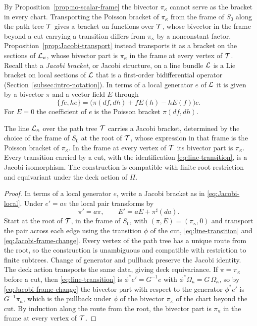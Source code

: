 By Proposition~\ref{prop:no-scalar-frame} the bivector $\pi_\kappa$ cannot
serve as the bracket in every chart.  Transporting the Poisson bracket of
$\pi_\kappa$ from the frame of $S_0$ along the path tree $\mathcal T$ gives a
bracket on functions over $\mathcal T$, whose bivector in the frame beyond a cut
carrying a transition differs from $\pi_\kappa$ by a nonconstant factor.
Proposition~\ref{prop:Jacobi-transport} instead transports it as a bracket on
the sections of $\mathcal L_\kappa$, whose bivector part is $\pi_\kappa$ in the
frame at every vertex of $\mathcal T$.  Recall that a \emph{Jacobi
bracket}, or Jacobi structure, on a line bundle $\mathcal L$ is a Lie bracket on
local sections of $\mathcal L$ that is a first-order bidifferential operator
\cite{kirillov1976,lichnerowicz1978,vitaglianowade2016}
(Section~\ref{subsec:intro-notation}).  In terms of a local generator $e$
of $\mathcal L$ it is given by a bivector $\pi$ and a vector field $E$ through
\begin{equation}\label{eq:Jacobi-local}
 \{fe,he\}=\bigl(\pi(df,dh)+fE(h)-hE(f)\bigr)e.
\end{equation}
For $E=0$ the coefficient of $e$ is the Poisson bracket $\pi(df,dh)$.

\begin{proposition}\label{prop:Jacobi-transport}
The line $\mathcal L_\kappa$ over the path tree $\mathcal T$ carries a Jacobi bracket,
determined by the choice of the frame of $S_0$ at the root of $\mathcal T$, whose
expression in that frame is the Poisson bracket of $\pi_\kappa$.  In the
frame at every vertex of $\mathcal T$ its bivector part is $\pi_\kappa$.  Every
transition carried by a cut, with the identification
\eqref{eq:line-transition}, is a Jacobi isomorphism.  The construction is
compatible with finite root restriction and equivariant under the deck
action of $\Pi$.
\end{proposition}

\begin{proof}
In terms of a local generator $e$, write a Jacobi bracket as in
\eqref{eq:Jacobi-local}.  Under $e'=ae$ the local pair transforms by
\begin{equation}\label{eq:Jacobi-frame-change}
 \pi'=a\pi,
 \qquad E'=aE+\pi^\sharp(da).
\end{equation}
Start at the root of $\mathcal T$, in the frame of $S_0$, with
$(\pi,E)=(\pi_\kappa,0)$ and transport the pair across each edge using
the transition $\phi$ of the cut, \eqref{eq:line-transition} and
\eqref{eq:Jacobi-frame-change}.  Every vertex
of the path tree has a unique route from the root, so the construction is
unambiguous and compatible with restriction to finite subtrees.  Change of
generator and pullback preserve the Jacobi identity.  The deck action transports
the same data, giving deck equivariance.  If $\pi=\pi_\kappa$ before a
cut, then \eqref{eq:line-transition} is $\phi^*e'=G^{-1}e$ with
$\phi^*\Omega_\kappa=G\,\Omega_\kappa$, so by
\eqref{eq:Jacobi-frame-change} the bivector part with respect to the
generator $\phi^*e'$ is $G^{-1}\pi_\kappa$, which is the pullback under
$\phi$ of the bivector
$\pi_\kappa$ of the chart beyond the cut.  By induction along the route from
the root, the bivector part is $\pi_\kappa$ in the frame at every vertex of
$\mathcal T$.
\end{proof}

